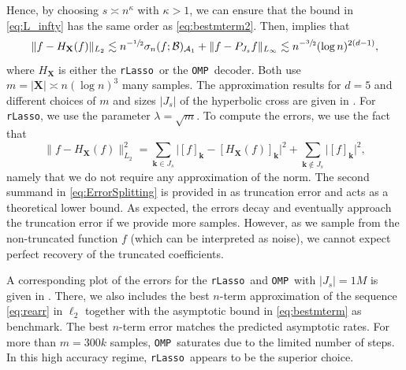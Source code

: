 \documentclass[11pt,reqno, a4paper]{article}
\numberwithin{equation}{section}
\newcommand{\rlasso}{\texttt{rLasso}}
\newcommand{\omp}{\texttt{OMP}}
\begin{document}
Hence, by choosing $s \asymp n^\kappa$ with $\kappa>1$, we can ensure that the bound in \eqref{eq:L_infty} has the same order as \eqref{eq:bestmterm2}.
Then,  implies that
\begin{equation}
	\lVert f - H_{\mathbf{X}}(f)\rVert_{L_2} \lesssim n^{-\sfrac{1}{2}}\sigma_n(f;\mathcal{B})_{\mathcal{A}_1} + \lVert f-P_{J_s}f\rVert_{L_\infty} \lesssim n^{-\sfrac{3}{2}}(\log n)^{2(d-1)},
\end{equation}
where $H_{\mathbf{X}}$ is either the \rlasso \ or the \omp \ decoder.
Both use $m = \lvert\mathbf{X}\rvert \asymp n(\log n)^3$ many samples.
The approximation results for $d=5$ and different choices of $m$ and sizes $\lvert J_s\rvert$  of the hyperbolic cross are given in .
For \rlasso, we use the parameter $\lambda = \sqrt{m}$.
To compute the errors, we use the fact that
\begin{equation}\label{eq:ErrorSplitting}
    \lVert f - H_{\mathbf{X}}(f) \rVert^2_{L_2} = \sum_{\mathbf{k} \in J_s} \bigl\lvert [f]_{\mathbf{k}} - [H_{\mathbf{X}}(f)]_{\mathbf{k}} \bigr\rvert ^2 + \sum_{\mathbf{k} \notin J_s}  \bigl\lvert [f]_{\mathbf{k}}\bigr\rvert^2,
\end{equation}
namely that we do not require any approximation of the norm.
The second summand in \eqref{eq:ErrorSplitting} is provided in  as truncation error and acts as a theoretical lower bound.
As expected, the errors decay and eventually approach the truncation error if we provide more samples.
However, as we sample from the non-truncated function $f$ (which can be interpreted as noise), we cannot expect perfect recovery of the truncated coefficients.

A corresponding plot of the errors for the \rlasso \ and \omp \ with $\lvert J_s \rvert = 1M$ is given in .
There, we also includes the best $n$-term approximation of the sequence \eqref{eq:rearr} in $\ell_2$ together with the asymptotic bound in \eqref{eq:bestmterm} as benchmark.
The best $n$-term error matches the predicted asymptotic rates.
For more than $m=300k$ samples, \omp \ saturates due to the limited number of steps.
In this high accuracy regime, \rlasso \ appears to be the superior choice.
\end{document}
